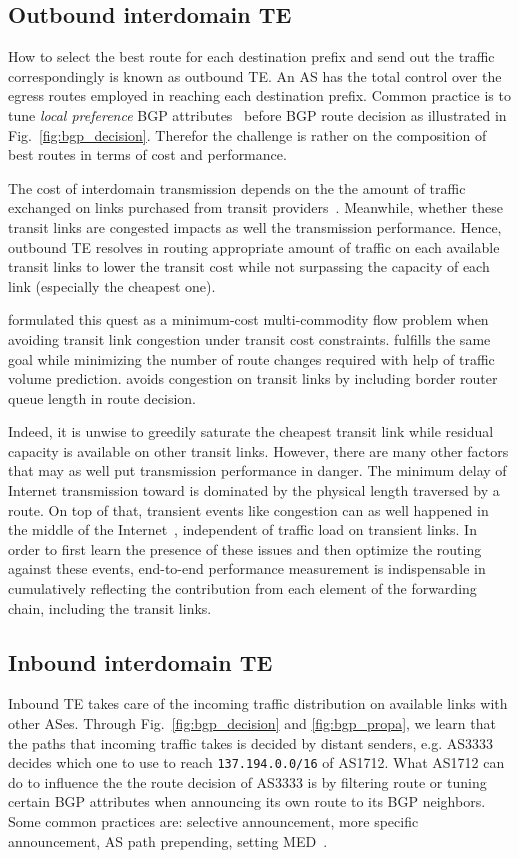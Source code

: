 \subsection{Outbound interdomain TE}
How to select the best route for each destination prefix and send out the traffic correspondingly is known as outbound TE. 
An AS has the total control over the egress routes employed in reaching each destination prefix. Common practice is to tune \textit{local preference} BGP attributes~\cite{Wang2008} before BGP route decision as illustrated in Fig.~\ref{fig:bgp_decision}. 
Therefor the challenge is rather on the composition of best routes in terms of cost and performance.

The cost of interdomain transmission depends on the the amount of traffic exchanged on links purchased from transit providers~\cite{drpeering-95th}.
Meanwhile, whether these transit links are congested impacts as well the transmission performance.
Hence, outbound TE resolves in routing appropriate amount of traffic on each available transit links to lower the transit cost while not surpassing the capacity of each link (especially the cheapest one).

\citet{Goldenberg2004} formulated this quest as a minimum-cost multi-commodity flow problem when avoiding transit link congestion under transit cost constraints.
\citet{Uhlig2004b} fulfills the same goal while minimizing the number of route changes required with help of traffic volume prediction.
\citet{Zhu2014} avoids congestion on transit links by including border router queue length in route decision.

Indeed, it is unwise to greedily saturate the cheapest transit link while residual capacity is available on other transit links.
However, there are many other factors that may as well put transmission performance in danger.
The minimum delay of Internet transmission toward is dominated by the physical length traversed by a route. 
On top of that, transient events like congestion can as well happened in the middle of the Internet~\cite{Akella2003, Luckie2014}, independent of traffic load on transient links.
In order to first learn the presence of these issues and then optimize the routing against these events, end-to-end performance measurement is indispensable in cumulatively reflecting the contribution from each element of the forwarding chain, including the transit links.


\subsection{Inbound interdomain TE}
Inbound TE takes care of the incoming traffic distribution on available links with other ASes.
Through Fig.~\ref{fig:bgp_decision} and \ref{fig:bgp_propa}, we learn that the paths that incoming traffic takes is decided by distant senders, e.g. AS3333 decides which one to use to reach \texttt{137.194.0.0/16} of AS1712.
What AS1712 can do to influence the the route decision of AS3333 is by 
filtering route or tuning certain BGP attributes when announcing its own route to its BGP neighbors.
Some common practices are: selective announcement, more specific announcement, AS path prepending, setting \ac{MED}~\cite{Wang2008}.

